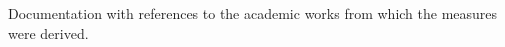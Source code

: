 \documentclass[preview]{standalone}
\begin{document}
Documentation with references to the academic works from which the measures were derived.\\
\end{document}
